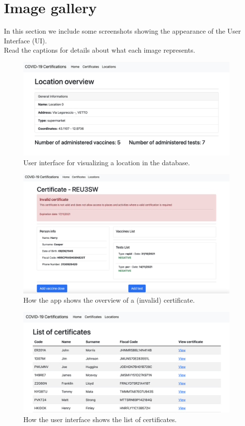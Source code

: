 \documentclass{article}
\begin{document}
\section{Image gallery}
In this section we include some screenshots showing the appearance of the User Interface (UI).\\Read the captions for details about what each image represents.
    \begin{figure}[ht!]
    \centering
    \includegraphics[scale=0.3]{screenshots/location.png}
    \caption{User interface for visualizing a location in the database.}
\end{figure}
\begin{figure}[ht!]
    \centering
    \includegraphics[scale=0.3]{screenshots/certificate.png}
    \caption{How the app shows the overview of a (invalid) certificate.}
\end{figure}
\begin{figure}[ht!]
    \centering
    \includegraphics[scale=0.3]{screenshots/certificatelist.png}
    \caption{How the user interface shows the list of certificates.}
\end{figure}
\end{document}
